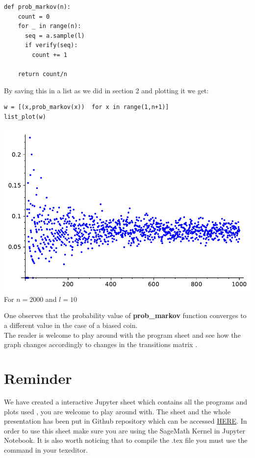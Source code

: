 \documentclass[a4paper,13pt,oneside]{article}
\theoremstyle{remark}
\begin{document}
\begin{verbatim}
def prob_markov(n):
	count = 0
	for _ in range(n):
	  seq = a.sample(l)
	  if verify(seq):
	    count += 1
	
	return count/n

\end{verbatim}
By saving this in a list as we did in section 2 and plotting it we get:
\begin{verbatim}
w = [(x,prob_markov(x))  for x in range(1,n+1)]
list_plot(w)
\end{verbatim}
\begin{center}
\includegraphics[width=.7\linewidth]{m.pdf}\\
For $n=2000$ and $l=10$
\end{center}

One observes that the probability value of \textbf{prob\_markov} function converges to a different value in the case of a biased coin.\\
The reader is welcome to play around with the program sheet and see how the graph changes accordingly to changes in the transitions matrix .

\section*{Reminder}

We have created a interactive Jupyter sheet which contains all the programs and plots used , you are welcome to play around with. The sheet and the whole presentation has been put in Github repository which can be accessed \href{https://github.com/DaSilvaMoreira/Betting_Game}{HERE}. In order to use this sheet make sure you are using the SageMath Kernel in Jupyter Notebook. It is also worth noticing that to compile the .tex file you must use the  command in your texeditor.
\end{document}
